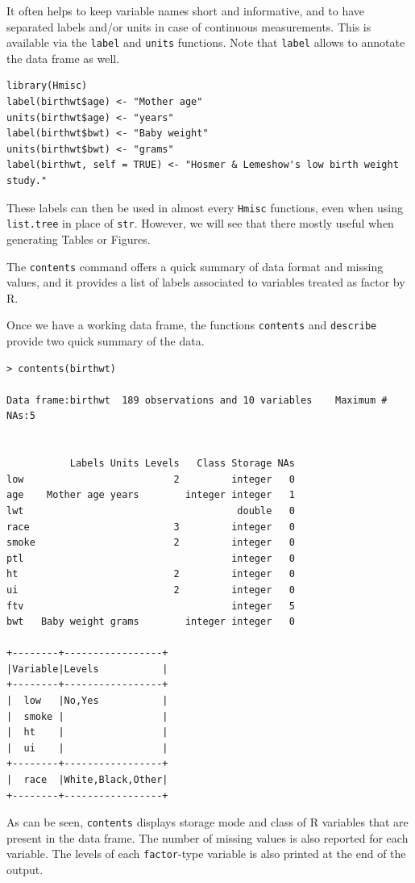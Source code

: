 \documentclass[a4paper,twoside]{book}
\renewcommand{\texttt}[1]{\lstinline{#1}}
\begin{document}
It often helps to keep variable names short and informative, and to have
separated labels and/or units in case of continuous measurements. This is
available via the \texttt{label} and \texttt{units} functions. Note that
\texttt{label} allows to annotate the data frame as well.

\begin{verbatim}
library(Hmisc)
label(birthwt$age) <- "Mother age"
units(birthwt$age) <- "years"
label(birthwt$bwt) <- "Baby weight"
units(birthwt$bwt) <- "grams"
label(birthwt, self = TRUE) <- "Hosmer & Lemeshow's low birth weight study."
\end{verbatim}

These labels can then be used in almost every \texttt{Hmisc} functions, even
when using \texttt{list.tree} in place of \texttt{str}. However, we will see
that there mostly useful when generating Tables or Figures.

The \texttt{contents} command offers a quick summary of data format and
missing values, and it provides a list of labels associated to variables
treated as factor by R.

Once we have a working data frame, the functions \texttt{contents} and
\texttt{describe} provide two quick summary of the data.

\begin{verbatim}
> contents(birthwt)

Data frame:birthwt	189 observations and 10 variables    Maximum # NAs:5


           Labels Units Levels   Class Storage NAs
low                          2         integer   0
age    Mother age years        integer integer   1
lwt                                     double   0
race                         3         integer   0
smoke                        2         integer   0
ptl                                    integer   0
ht                           2         integer   0
ui                           2         integer   0
ftv                                    integer   5
bwt   Baby weight grams        integer integer   0

+--------+-----------------+
|Variable|Levels           |
+--------+-----------------+
|  low   |No,Yes           |
|  smoke |                 |
|  ht    |                 |
|  ui    |                 |
+--------+-----------------+
|  race  |White,Black,Other|
+--------+-----------------+
\end{verbatim}

As can be seen, \texttt{contents} displays storage mode and class of R
variables that are present in the data frame. The number of missing values
is also reported for each variable. The levels of each \texttt{factor}-type
variable is also printed at the end of the output.
\end{document}
